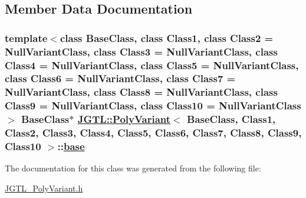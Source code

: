 \subsection{Member Data Documentation}
\hypertarget{class_j_g_t_l_1_1_poly_variant_9731a2eb9f328710229e3574e9063caa}{
\subsubsection[base]{\setlength{\rightskip}{0pt plus 5cm}template$<$class Base\-Class, class Class1, class Class2 = Null\-Variant\-Class, class Class3 = Null\-Variant\-Class, class Class4 = Null\-Variant\-Class, class Class5 = Null\-Variant\-Class, class Class6 = Null\-Variant\-Class, class Class7 = Null\-Variant\-Class, class Class8 = Null\-Variant\-Class, class Class9 = Null\-Variant\-Class, class Class10 = Null\-Variant\-Class$>$ Base\-Class$\ast$ \hyperlink{class_j_g_t_l_1_1_poly_variant}{JGTL::Poly\-Variant}$<$ Base\-Class, Class1, Class2, Class3, Class4, Class5, Class6, Class7, Class8, Class9, Class10 $>$::\hyperlink{class_j_g_t_l_1_1_poly_variant_9731a2eb9f328710229e3574e9063caa}{base}}}
\label{class_j_g_t_l_1_1_poly_variant_9731a2eb9f328710229e3574e9063caa}




The documentation for this class was generated from the following file:\begin{CompactItemize}
\item 
\hyperlink{_j_g_t_l___poly_variant_8h}{JGTL\_\-Poly\-Variant.h}\end{CompactItemize}
